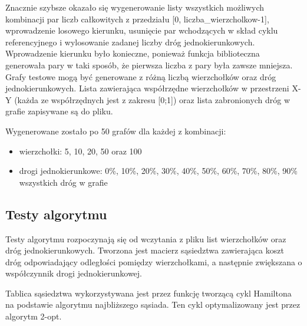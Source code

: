 \documentclass{article}
\begin{document}
Znacznie szybsze okazało się wygenerowanie listy wszystkich możliwych kombinacji par liczb całkowitych z przedziału [0, liczba\_wierzcholkow-1], wprowadzenie losowego kierunku, usunięcie par wchodzących w skład cyklu referencyjnego i wylosowanie zadanej liczby dróg jednokierunkowych. Wprowadzenie kierunku było konieczne, ponieważ funkcja biblioteczna generowała pary w taki sposób, że pierwsza liczba z pary była zawsze mniejsza. \\

Grafy testowe mogą być generowane z różną liczbą wierzchołków oraz dróg jednokierunkowych. Lista zawierająca współrzędne wierzchołków w przestrzeni X-Y (każda ze współrzędnych jest z zakresu [0;1]) oraz lista zabronionych dróg w grafie zapisywane są do pliku.

Wygenerowane zostało po 50 grafów dla każdej z kombinacji:
\begin{itemize}
\item wierzchołki: 5, 10, 20, 50 oraz 100
\item drogi jednokierunkowe: 0\%, 10\%, 20\%, 30\%, 40\%, 50\%, 60\%, 70\%, 80\%, 90\% wszystkich dróg w grafie
\end{itemize}
%



\subsection{Testy algorytmu}
\label{ss_testy}

Testy algorytmu rozpoczynają się od wczytania z pliku list wierzchołków oraz dróg jednokierunkowych. Tworzona jest macierz sąsiedztwa zawierająca koszt dróg odpowiadający odległości pomiędzy wierzchołkami, a następnie zwiększana o współczynnik drogi jednokierunkowej.

Tablica sąsiedztwa wykorzystywana jest przez funkcję tworzącą cykl Hamiltona na podstawie algorytmu najbliższego sąsiada. Ten cykl optymalizowany jest przez algorytm 2-opt. \\
\end{document}
